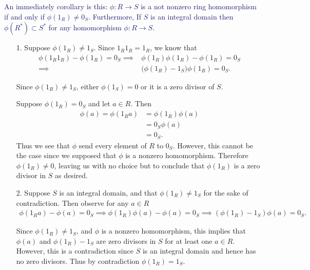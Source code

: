     \textcolor{MidnightBlue}{An immediately corollary is this:
    $\phi: R \to S$ is a not nonzero ring homomorphism if and only if
    $\phi(1_R) \ne 0_S$. Furthermore, 
    If
    $S$ is an integral domain then $\phi(R^*) \subset S^*$ for any
    homomorphism $\phi: R \to S$.
    }

    \begin{prf}
        \begin{itemize}
            \item[1.] Suppose $\phi(1_R) \ne 1_S$. Since $1_R1_R =
            1_R$, we know that
            \begin{align*}
                    \phi(1_R1_R) - \phi(1_R) = 0_S
                \implies &
                \phi(1_R)\phi(1_R) - \phi(1_R) = 0_S\\
                \implies & \big(\phi(1_R) - 1_S\big)\phi(1_R) = 0_S.
            \end{align*}

            Since $\phi(1_R) \ne 1_S$, either $\phi(1_S) = 0$ or it is a zero
            divisor of $S$. 

            Suppose $\phi(1_R) = 0_S$ and let $a \in R$. Then
            \begin{align*}
                \phi(a) = \phi(1_Ra) 
                        &= \phi(1_R)\phi(a)\\
                        &= 0_S\phi(a)\\
                        &= 0_S.
            \end{align*}
            Thus we see that $\phi$ send every element of $R$ to $0_S$.
            However, this cannot be the case since we supposed that $\phi$ is a
            nonzero homomorphism. 
Therefore $\phi(1_R)\ne 0$, leaving us with no
            choice but to conclude that $\phi(1_R)$ is a zero divisor in $S$
            as desired.   

            \item[2.]
            Suppose $S$ is an integral domain, and that $\phi(1_R)
            \ne 1_S$ for the sake of contradiction. Then observe
            for any $a \in R$
            \begin{align*}
                \phi(1_R a) - \phi(a) = 0_S \implies \phi(1_R)\phi(a) - \phi(a) = 0_S
                \implies (\phi(1_R) - 1_S)\phi(a) = 0_S.
            \end{align*}

            Since $\phi(1_R) \ne 1_S$, and $\phi$ is a nonzero homomorphism,
            this implies that $\phi(a)$ and $\phi(1_R) - 1_S$ are zero
            divisors in $S$ for at least one $a \in R$. However, this is a
            contradiction since $S$ is an integral domain and hence has no
            zero divisors. Thus by contradiction $\phi(1_R) =
            1_S$.
            

\end{itemize}
\end{prf}
